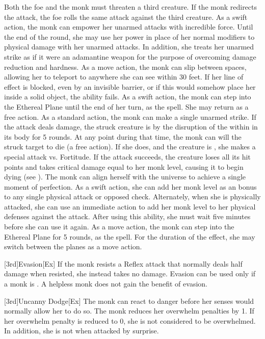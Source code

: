 Both the foe and the monk must threaten a third creature.
If the monk redirects the attack, the foe rolls the same attack against the third creature.
As a swift action, the monk can empower her unarmed attacks with incredible force.
Until the end of the round, she may use her \ki power in place of her normal modifiers to physical damage with her unarmed attacks.
In addition, she treats her unarmed strike as if it were an adamantine weapon for the purpose of overcoming damage reduction and hardness.
As a move action, the monk can slip between spaces, allowing her to teleport to anywhere she can see within 30 feet.
If her line of effect is blocked, even by an invisible barrier, or if this would somehow place her inside a solid object, the ability fails.
 As a swift action, the monk can step into the Ethereal Plane until the end of her turn, as the 
spell.
She may return as a free action.
As a standard action, the monk can make a single unarmed strike.
If the attack deals damage, the struck creature is \sickened by the disruption of the \ki within in its body for 5 rounds.
At any point during that time, the monk can will the struck target to die (a free action).
If she does, and the creature is \bloodied, she makes a special attack vs. Fortitude.
If the attack succeeds, the creature loses all its hit points and takes critical damage equal to her monk level, causing it to begin dying (see ).
The monk can align herself with the universe to achieve a single moment of perfection.
As a swift action, she can add her monk level as an bonus to any single physical attack or opposed check.
Alternately, when she is physically attacked, she can use an immediate action to add her monk level to her physical defenses against the attack.
After using this ability, she must wait five minutes before she can use it again.
 As a move action, the monk can step into the Ethereal Plane for 5 rounds, as the 
spell.
For the duration of the effect, she may switch between the planes as a move action.

[3rd]{Evasion}[Ex]
If the monk resists a Reflex attack that normally deals half damage when resisted, she instead takes no damage.
Evasion can be used only if a monk is \unencumbered.
A helpless monk does not gain the benefit of evasion.

[3rd]{Uncanny Dodge}[Ex]
The monk can react to danger before her senses would normally allow her to do so.
The monk reduces her overwhelm penalties by 1.
If her overwhelm penalty is reduced to 0, she is not considered to be overwhelmed.
In addition, she is not \unaware when attacked by surprise.

